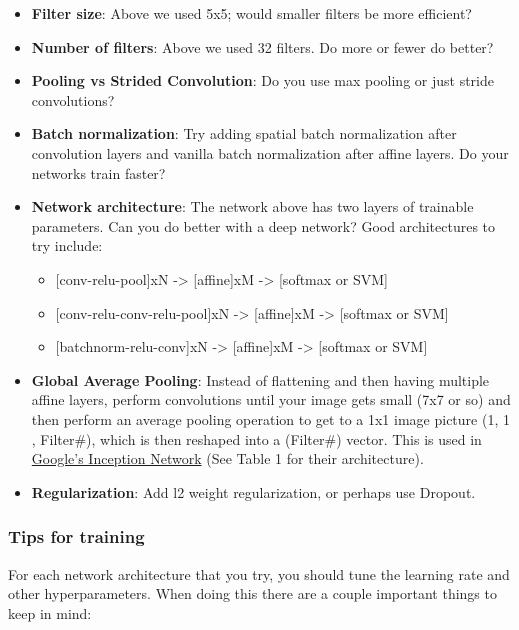 \documentclass[11pt]{article}
\providecommand{\tightlist}{%
      \setlength{\itemsep}{0pt}\setlength{\parskip}{0pt}}
\begin{document}
\begin{itemize}
\tightlist
\item
  \textbf{Filter size}: Above we used 5x5; would smaller filters be more
  efficient?
\item
  \textbf{Number of filters}: Above we used 32 filters. Do more or fewer
  do better?
\item
  \textbf{Pooling vs Strided Convolution}: Do you use max pooling or
  just stride convolutions?
\item
  \textbf{Batch normalization}: Try adding spatial batch normalization
  after convolution layers and vanilla batch normalization after affine
  layers. Do your networks train faster?
\item
  \textbf{Network architecture}: The network above has two layers of
  trainable parameters. Can you do better with a deep network? Good
  architectures to try include:

  \begin{itemize}
  \tightlist
  \item
    {[}conv-relu-pool{]}xN -\textgreater{} {[}affine{]}xM
    -\textgreater{} {[}softmax or SVM{]}
  \item
    {[}conv-relu-conv-relu-pool{]}xN -\textgreater{} {[}affine{]}xM
    -\textgreater{} {[}softmax or SVM{]}
  \item
    {[}batchnorm-relu-conv{]}xN -\textgreater{} {[}affine{]}xM
    -\textgreater{} {[}softmax or SVM{]}
  \end{itemize}
\item
  \textbf{Global Average Pooling}: Instead of flattening and then having
  multiple affine layers, perform convolutions until your image gets
  small (7x7 or so) and then perform an average pooling operation to get
  to a 1x1 image picture (1, 1 , Filter\#), which is then reshaped into
  a (Filter\#) vector. This is used in
  \href{https://arxiv.org/abs/1512.00567}{Google's Inception Network}
  (See Table 1 for their architecture).
\item
  \textbf{Regularization}: Add l2 weight regularization, or perhaps use
  Dropout.
\end{itemize}

\hypertarget{tips-for-training}{%
\subsubsection{Tips for training}\label{tips-for-training}}

For each network architecture that you try, you should tune the learning
rate and other hyperparameters. When doing this there are a couple
important things to keep in mind:
\end{document}
